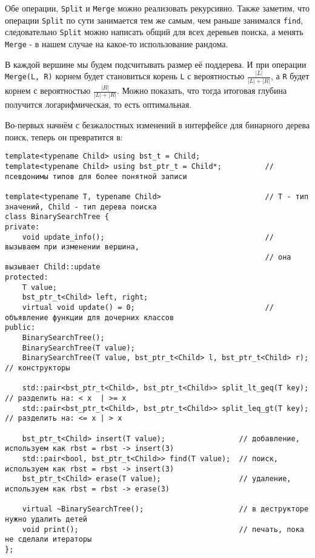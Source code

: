 Обе операции, \texttt{Split} и \texttt{Merge} можно реализовать рекурсивно. Также заметим, что операции \texttt{Split} по сути занимается тем же самым, чем раньше занимался \texttt{find}, следовательно \texttt{Split} можно написать общий для всех деревьев поиска, а менять \texttt{Merge} - в нашем случае на какое-то использование рандома.


В каждой вершине мы будем подсчитывать размер её поддерева. И при операции \texttt{Merge(L, R)} корнем будет становиться корень \texttt{L} с вероятностью $\frac{|L|}{|L| + |R|}$, а \texttt{R} будет корнем с вероятностью $\frac{|R|}{|L| + |R|}$. Можно показать, что тогда итоговая глубина получится логарифмическая, то есть оптимальная.


Во-первых начнём с безжалостных изменений в интерфейсе для бинарного дерева поиск, теперь он превратится в:
\begin{verbatim}
template<typename Child> using bst_t = Child;
template<typename Child> using bst_ptr_t = Child*;          // псевдонимы типов для более понятной записи

template<typename T, typename Child>                        // T - тип значений, Child - тип дерева поиска
class BinarySearchTree {
private:
    void update_info();                                     // вызываем при изменении вершина,
                                                            // она вызывает Child::update
protected:
    T value;
    bst_ptr_t<Child> left, right;
    virtual void update() = 0;                              // объявление функции для дочерних классов
public:
    BinarySearchTree();
    BinarySearchTree(T value);
    BinarySearchTree(T value, bst_ptr_t<Child> l, bst_ptr_t<Child> r);      // конструкторы

    std::pair<bst_ptr_t<Child>, bst_ptr_t<Child>> split_lt_geq(T key);      // разделить на: < x  | >= x
    std::pair<bst_ptr_t<Child>, bst_ptr_t<Child>> split_leq_gt(T key);      // разделить на: <= x | > x

    bst_ptr_t<Child> insert(T value);                 // добавление, используем как rbst = rbst -> insert(3)
    std::pair<bool, bst_ptr_t<Child>> find(T value);  // поиск, используем как rbst = rbst -> insert(3)
    bst_ptr_t<Child> erase(T value);                  // удаление, используем как rbst = rbst -> erase(3)

    virtual ~BinarySearchTree();                      // в деструкторе нужно удалить детей
    void print();                                     // печать, пока не сделали итераторы
};
\end{verbatim}

